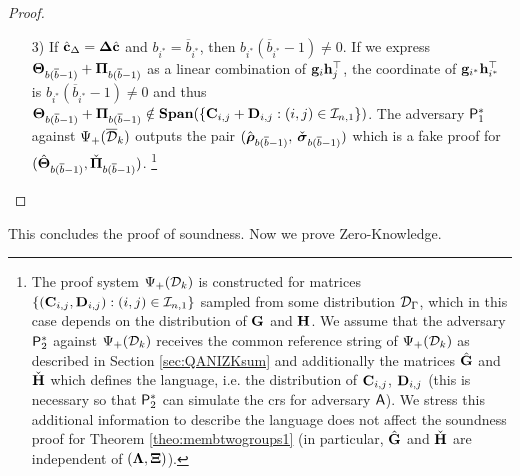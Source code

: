 \begin{proof}
\begin{itemize}
$\advSound_2$ against the strong soundness of $\QANIZKcomms$
outputs the pair $(\hgrkb{\rho}_{b-\overline{b}},
\cgrkb{\sigma}_{b-\overline{b}})
$ which is a fake proof for 
$(\hvecb{c}_\Delta,\cvecb{d})$. Note that strong soundness is required since, in order to compute $\{\hmatr{C}_{i,j},\cmatr{D}_{i,j}:(i,j)\in\indexSet{n}{1}\}$, $\advSound_2$ requires the discrete logs of either $\hmatr{G}$ or $\cmatr{D}$.
\item[3)] If $\hat{\mathbf{c}}_{\Delta} = \mathbf{{\Delta}} \hat{\mathbf{c}}$ and $b_{i^*} = \overline{b}_{i^*}$, then 
$b_{i^*}(\overline{b}_{i^*} -1) \neq 0$.
If we express $\mathbf{{\Theta}}_{b(\overline{b}-1)}+\mathbf{{\Pi}}_{b(\overline{b}-1)}$
as a linear combination of $\mathbf{g}_{i}\mathbf{h}_{j}^{\top}$, the coordinate of
$\mathbf{g}_{i^*}\mathbf{h}_{i^*}^\top$ is $b_{i^*}(\overline{b}_{i^*}-1)\neq 0$ and thus $\mathbf{{\Theta}}_{b(\overline{b}-1)}+\mathbf{{\Pi}}_{b(\overline{b}-1)}\notin\mathbf{Span}(\{\mathbf{{C}}_{i,j}+\mathbf{{D}}_{i,j}:(i,j)\in\mathcal{I}_{n,1}\})$.
The adversary $\mathsf{P}^*_1$ against ${\Psi_{+}(\overline{\mathcal{D}}_k)}$  outputs the pair
$(\hat{{\boldsymbol \rho}}_{b(\overline{b}-1)},$ $\check{{\boldsymbol \sigma}}_{b(\overline{b}-1)})$
which is a fake proof for $({\hat{\mathbf{{\Theta}}}}_{b(\overline{b}-1)}, \check{\mathbf{{\Pi}}}_{b(\overline{b}-1)})$. \footnote{The proof system $\Psi_{+}(\mathcal{D}_k)$ is constructed for matrices $\{(\mathbf{{C}}_{i,j},\mathbf{{D}}_{i,j}):(i,j)\in\mathcal{I}_{n,1}\}$ sampled from some distribution $\mathcal{D}_{\Gamma}$, which in this case depends on the distribution of $\mathbf{{G}}$ and $\mathbf{{H}}$. We assume that the adversary $\advSound_2$ against $\Psi_{+}(\mathcal{D}_k)$ receives the common reference string of $\Psi_{+}(\mathcal{D}_k)$ as described in Section \ref{sec:QANIZKsum} and additionally the matrices $\hmatr{G}$ and $\check{\mathbf{{H}}}$ which defines the language, i.e. the distribution of $\mathbf{{C}}_{i,j}$, $\mathbf{{D}}_{i,j}$ (this is necessary so that $\advSound_2$ can simulate the crs for adversary $\mathsf{A}$). We stress this additional information to describe the language does not affect the soundness proof for Theorem \ref{theo:membtwogroups1} (in particular,  $\hmatr{G}$ and $\check{\mathbf{{H}}}$ are independent of $(\mathbf{{\Lambda}}, \mathbf{{\Xi}})$).}
\end{itemize}
\end{proof}

This concludes the proof of soundness. Now we prove Zero-Knowledge.

